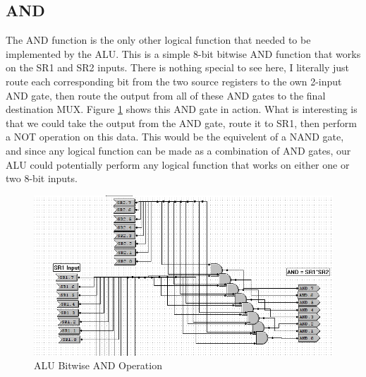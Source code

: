 \documentclass[a4paper,11pt]{article}
\begin{document}
\subsection{AND}
The AND function is the only other logical function that needed to be implemented by the ALU. This is a simple 8-bit bitwise AND function that works on the SR1 and SR2 inputs. There is nothing special to see here, I literally just route each corresponding bit from the two source registers to the own 2-input AND gate, then route the output from all of these AND gates to the final destination MUX. Figure \ref{fig:andfunction} shows this AND gate in action. What is interesting is that we could take the output from the AND gate, route it to SR1, then perform a NOT operation on this data. This would be the equivelent of a NAND gate, and since any logical function can be made as a combination of AND gates, our ALU could potentially perform any logical function that works on either one or two 8-bit inputs.

  \begin{figure}[h!]
       \includegraphics[width=5.4in]{pictures/andfunction}
     \caption{ALU Bitwise AND Operation}
     \label{fig:andfunction}
  \end{figure} 



\end{document}
